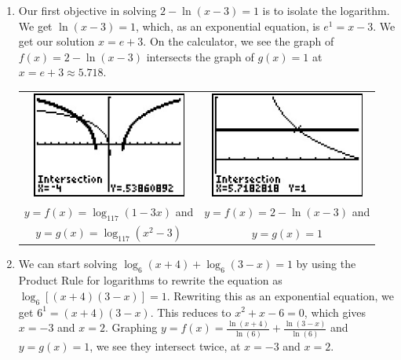 \begin{ex}
\begin{enumerate}
\item  Our first objective in solving $2 - \ln(x-3) = 1$ is to isolate the logarithm.  We get $\ln(x-3)=1$, which, as an exponential equation, is $e^{1} = x-3$.  We get our solution $x=e+3$. On the calculator, we see the graph of $f(x) = 2 - \ln(x-3)$ intersects  the graph of $g(x) = 1$ at $x = e+3 \approx 5.718$.

\begin{center}

\begin{tabular}{cc}

\includegraphics[width=2in]{./ExpLogsGraphics/LogEqns01.jpg} &

\hspace{0.75in} \includegraphics[width=2in]{./ExpLogsGraphics/LogEqns02.jpg} \\

$y = f(x) =\log_{117}(1-3x)$ and   & 

 \hspace{0.75in}  $y = f(x) =  2 - \ln(x-3)$ and \\
 
 \boldmath $y=g(x) =\log_{117}\left(x^2-3\right)$ & 
 \hspace{0.75in} \boldmath $y=g(x) = 1$  \\

\end{tabular}

\end{center}

\item We can start solving $\log_{6}(x+4) + \log_{6}(3-x) = 1$ by using the Product Rule for logarithms to rewrite the equation as  $\log_{6}\left[(x+4)(3-x)\right] = 1$.  Rewriting this as an exponential equation, we get $6^{1} = (x+4)(3-x)$.  This reduces to $x^2+x-6 = 0$, which gives $x=-3$ and $x=2$.   Graphing $y=f(x) =  \frac{\ln(x+4)}{\ln(6)} + \frac{\ln(3-x)}{\ln(6)}$ and $y=g(x) = 1$, we see they intersect twice, at $x=-3$ and $x=2$.


\end{enumerate}
\end{ex}
